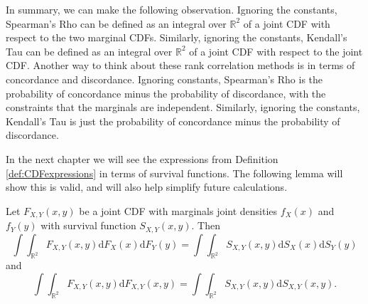 In summary, we can make the following observation. Ignoring the constants, Spearman's Rho can be defined as an integral over $\mathbb{R}^2$ of a joint CDF with respect to the two marginal CDFs. Similarly, ignoring the constants, Kendall's Tau can be defined as an integral over $\mathbb{R}^2$ of a joint CDF with respect to the joint CDF. Another way to think about these rank correlation methods is in terms of concordance and discordance. Ignoring constants, Spearman's Rho is the probability of concordance minus the probability of discordance, with the constraints that the marginals are independent. Similarly, ignoring the constants, Kendall's Tau is just the probability of concordance minus the probability of discordance.

In the next chapter we will see the expressions from Definition \ref{def:CDFexpressions} in terms of survival functions. The following lemma will show this is valid, and will also help simplify future calculations.
\begin{lemma}\label{lem:CDFsurvival}
    Let $F_{X,Y}\left(x,y\right)$ be a joint CDF with marginals joint densities $f_X\left(x\right)$ and $f_Y\left(y\right)$ with survival function $S_{X,Y}\left(x,y\right)$. Then $$\int\int_{\mathbb{R}^2}F_{X,Y}\left(x,y\right)\mathrm{d}F_X\left(x\right)\mathrm{d}F_Y\left(y\right)=\int\int_{\mathbb{R}^2}S_{X,Y}\left(x,y\right)\mathrm{d}S_X\left(x\right)\mathrm{d}S_{Y}\left(y\right)$$ and $$\int\int_{\mathbb{R}^2}F_{X,Y}\left(x,y\right)\mathrm{d}F_{X,Y}\left(x,y\right)=\int\int_{\mathbb{R}^2}S_{X,Y}\left(x,y\right)\mathrm{d}S_{X,Y}\left(x,y\right).$$
\end{lemma}
